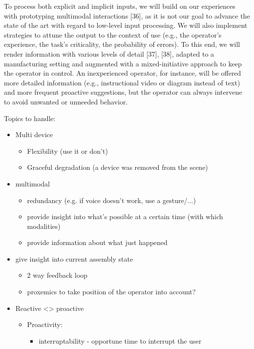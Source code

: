 To process both explicit and implicit inputs, we will build on our experiences with prototyping multimodal interactions [36], as it is not our goal to advance the state of the art with regard to low-level input processing. We will also implement strategies to attune the output to the context of use (e.g., the operator's experience, the task's criticality, the probability of errors). To this end, we will render information with various levels of detail [37], [38], adapted to a manufacturing setting and augmented with a mixed-initiative approach to keep the operator in control. An inexperienced operator, for instance, will be offered more detailed information (e.g., instructional video or diagram instead of text) and more frequent proactive suggestions, but the operator can always intervene to avoid unwanted or unneeded behavior.



Topics to handle:
\begin{itemize}
    \item Multi device
    \begin{itemize}
        \item Flexibility (use it or don't)
    \end{itemize}
    \begin{itemize}
        \item Graceful degradation (a device was removed from the scene)
    \end{itemize}
    \item multimodal
    \begin{itemize}
        \item redundancy (e.g. if voice doesn't work, use a gesture/...)
        \item provide insight into what's possible at a certain time (with which modalities)
        \item provide information about what just happened
    \end{itemize}
    \item give insight into current assembly state
    \begin{itemize}
        \item 2 way feedback loop
    \end{itemize}
    \begin{itemize}
        \item proxemics to take position of the operator into account?
    \end{itemize}
    \item Reactive <> proactive
    \begin{itemize}
        \item Proactivity:
        \begin{itemize}
            \item interruptability - opportune time to interrupt the user
        \end{itemize}
    \end{itemize}
\end{itemize}
\fi